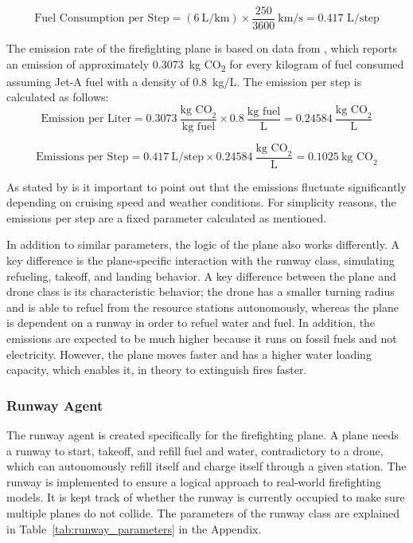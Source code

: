 \documentclass[11pt, a4paper]{article}
\begin{document}
\[
\text{Fuel Consumption per Step}= (6~\text{L/km}) \times \frac{250}{3600}~\text{km/s} = 0.417\text{ L/step}
\]

The emission rate of the firefighting plane is based on data from \citet*{spicerRapidMeasurementEmissions2009}, which reports an emission of approximately \SI{0.3073}{\kilo\gram} CO\textsubscript{2} for every kilogram of fuel consumed assuming Jet-A fuel with a density of 0.8~kg/L. The emission per step is calculated as follows: 
\[
\text{Emission per Liter}  = 0.3073~\frac{\text{kg CO}_2}{\text{kg fuel}} \times 0.8~\frac{\text{kg fuel}}{\text{L}} = 0.24584~\frac{\text{kg CO}_2}{\text{L}}
\]

\[
\text{Emissions per Step} = 0.417~\text{L/step} \times 0.24584~\frac{\text{kg CO}_2}{\text{L}} = 0.1025~\text{kg CO}_2
\]

As stated by \citet*{spicerRapidMeasurementEmissions2009} is it important to point out that the emissions fluctuate significantly depending on cruising speed and weather conditions. For simplicity reasons, the emissions per step are a fixed parameter calculated as mentioned.

In addition to similar parameters, the logic of the plane also works differently. A key difference is the plane-specific interaction with the runway class, simulating refueling, takeoff, and landing behavior. A key difference between the plane and drone class is its characteristic behavior; the drone has a smaller turning radius and is able to refuel from the resource stations autonomously, whereas the plane is dependent on a runway in order to refuel water and fuel. In addition, the emissions are expected to be much higher because it runs on fossil fuels and not electricity. However, the plane moves faster and has a higher water loading capacity, which enables it, in theory to extinguish fires faster. 

\subsubsection{Runway Agent}
\label{sec:RunwayClass}
The runway agent is created specifically for the firefighting plane. A plane needs a runway to start, takeoff, and refill fuel and water, contradictory to a drone, which can autonomously refill itself and charge itself through a given station. The runway is implemented to ensure a logical approach to real-world firefighting models. It is kept track of whether the runway is currently occupied to make sure multiple planes do not collide. The parameters of the runway class are explained in Table~\ref{tab:runway_parameters} in the Appendix.
\end{document}
